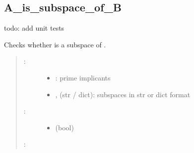 \documentclass[letterpaper,10pt,english]{sphinxmanual}
\begin{document}
\subsection{A\_is\_subspace\_of\_B}
\label{\detokenize{StateTransitionGraphs:a-is-subspace-of-b}}\label{\detokenize{StateTransitionGraphs:id14}}

\begin{fulllineitems}
\label{\detokenize{StateTransitionGraphs:PyBoolNet.StateTransitionGraphs.A_is_subspace_of_B}}
todo: add unit tests

Checks whether  is a subspace of .
\begin{quote}
\begin{description}
\item[{:}] \leavevmode\begin{itemize}
\item {} 
: prime implicants

\item {} 
,  (str / dict): subspaces in str or dict format

\end{itemize}

\item[{:}] \leavevmode\begin{itemize}
\item {} 
 (bool)

\end{itemize}

\end{description}

:

\begin{sphinxVerbatim}[commandchars=\\\{\}]
  
\end{sphinxVerbatim}
\end{quote}

\end{fulllineitems}
\end{document}
